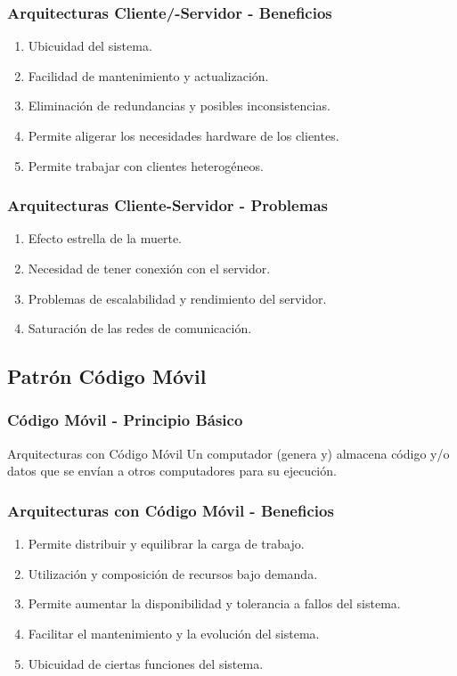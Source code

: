 \documentclass[a4paper,t,xcolor=pst,dvips,colortheme]{beamer}
\begin{document}
\begin{frame}[c]
    \frametitle{Arquitecturas Cliente/-Servidor - Beneficios}
    \begin{enumerate}[<+->]
        \item Ubicuidad del sistema.
        \item Facilidad de mantenimiento y actualización.
        \item Eliminación de redundancias y posibles inconsistencias.
        \item Permite aligerar los necesidades hardware de los clientes.
        \item Permite trabajar con clientes heterogéneos.
    \end{enumerate}
\end{frame}

\begin{frame}[c]
    \frametitle{Arquitecturas Cliente-Servidor - Problemas}
    \begin{enumerate}[<+->]
        \item Efecto estrella de la muerte.
        \item Necesidad de tener conexión con el servidor.
        \item Problemas de escalabilidad y rendimiento del servidor.
        \item Saturación de las redes de comunicación.
    \end{enumerate}
\end{frame}

\subsection{Patrón Código Móvil}

\begin{frame}[c]
    \frametitle{Código Móvil - Principio Básico}
    \begin{block}{Arquitecturas con Código Móvil}
        Un computador (genera y) almacena código y/o datos que se envían a otros computadores para su ejecución.
    \end{block}
\end{frame}

\begin{frame}[c]
    \frametitle{Arquitecturas con Código Móvil - Beneficios}
    \begin{enumerate}[<+->]
        \item Permite distribuir y equilibrar la carga de trabajo.
        \item Utilización y composición de recursos bajo demanda.
        \item Permite aumentar la disponibilidad y tolerancia a fallos del sistema.
        \item Facilitar el mantenimiento y la evolución del sistema.
        \item Ubicuidad de ciertas funciones del sistema.
    \end{enumerate}
\end{frame}
\end{document}
